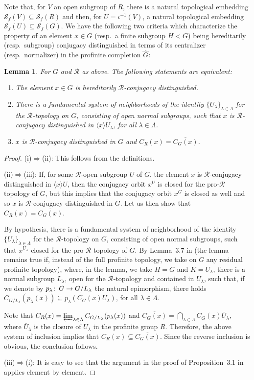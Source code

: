 \documentclass[12pt,twoside]{amsart}
\newcommand\la{\langle}
\newcommand\ra{\rangle}
\newcommand\cR{{\mathcal R}}
\newcommand\Ra{\Rightarrow}
\newcommand\ol{\overline}
\newcommand\cS{{\mathscr S}}
\newcommand\hG{{\widehat{G}}}
\newcommand\ld{\lambda}
\newcommand\Ld{\Lambda}
\def\co{\colon\thinspace}
\newtheorem{lemma}[theorem]{Lemma}
\theoremstyle{definition}
\begin{document}
Note that, for $V$ an open subgroup of $R$, there is a natural topological embedding $\cS_f(V)\subseteq\cS_f(R)$ and then, 
for $U=\iota^{-1}(V)$, a natural topological embedding $\cS_f(U)\subseteq\cS_f(G)$.
We have the following two criteria which characterize the property of an element $x\in G$ (resp.\ a finite subgroup $H<G$) 
being hereditarily (resp.\ subgroup) conjugacy distinguished in terms of its centralizer (resp.\ normalizer) in the profinite completion $\hG$:

\begin{lemma}\label{centcriterion}For $G$ and $\cR$ as above. The following statements are equivalent:
\begin{enumerate}
\item The element $x\in G$ is hereditarily $\cR$-conjugacy distinguished.
\item There is a fundamental system of neighborhoods of the identity $\{U_\ld\}_{\ld\in\Ld}$ for the $\cR$-topology on $G$, consisting 
of open normal subgroups, such that $x$ is $\cR$-conjugacy distinguished in $\la x\ra U_\ld$, for all $\ld\in\Ld$.
\item $x$ is $\cR$-conjugacy distinguished in $G$ and $C_{R}(x)=\ol{C_G(x)}$.
\end{enumerate}
\end{lemma}

\begin{proof}(i)$\Ra$(ii): This follows from the definitions.
\smallskip

\noindent
(ii)$\Ra$(iii): If, for some $\cR$-open subgroup $U$ of $G$, the element $x$ is $\cR$-conjugacy distinguished in $\la x\ra U$,
then the conjugacy orbit $x^U$ is closed for the pro-$\cR$ topology of $G$, but this implies that the conjugacy orbit $x^G$ is closed as well
and so $x$ is $\cR$-conjugacy distinguished in $G$. Let us then show that $C_{R}(x)=\ol{C_G(x)}$.

By hypothesis, there is a fundamental system of neighborhood of the identity $\{U_\ld\}_{\ld\in\Ld}$ for the $\cR$-topology on $G$, consisting 
of open normal subgroups, such that $x^{U_\ld}$ closed for the pro-$\cR$ topology of $G$.
By Lemma~3.7 in \cite{Minasyan} (the lemma remains true if, instead of the full profinite topology, we take on $G$ any residual profinite topology), 
where, in the lemma, we take $H=G$ and $K=U_\ld$, there is a normal subgroup $L_\ld$, open for the $\cR$-topology and contained in $U_\ld$,
such that, if we denote by $p_\ld\co G\to G/L_\ld$ the natural epimorphism, there holds $C_{G/L_\ld}(p_\ld(x))\subseteq p_\ld(C_G(x)U_\ld)$, for
all $\ld\in\Ld$.

Note that $C_R(x)=\varprojlim_{\ld\in\Ld}C_{G/L_\ld}(p_\ld(x))$ and $\ol{C_G(x)}=\bigcap_{\ld\in\Ld}C_G(x)\ol{U}_\ld$, where $\ol{U}_\ld$ is the
closure of $U_\ld$ in the profinite group $R$. Therefore, the above system of inclusion implies that $C_{R}(x)\subseteq\ol{C_G(x)}$. 
Since the reverse inclusion is obvious, the conclusion follows.
\smallskip

\noindent
(iii)$\Ra$(i): It is easy to see that the argument in the proof of Proposition~3.1 in \cite{CZ} applies element by element.
\end{proof}
\end{document}
